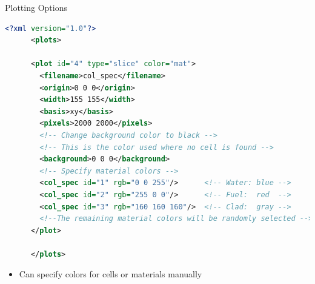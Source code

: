 
\begin{frame}[fragile]{Plotting Options}

  \begin{scriptsize}
    \begin{lstlisting}[language=XML,gobble=4]
      <?xml version="1.0"?>
      <plots>

      <plot id="4" type="slice" color="mat">
        <filename>col_spec</filename>
        <origin>0 0 0</origin>
        <width>155 155</width>
        <basis>xy</basis>
        <pixels>2000 2000</pixels>
        <!-- Change background color to black -->
        <!-- This is the color used where no cell is found -->
        <background>0 0 0</background>
        <!-- Specify material colors -->
        <col_spec id="1" rgb="0 0 255"/>      <!-- Water: blue -->
        <col_spec id="2" rgb="255 0 0"/>      <!-- Fuel:  red  -->
        <col_spec id="3" rgb="160 160 160"/>  <!-- Clad:  gray -->
        <!--The remaining material colors will be randomly selected -->
      </plot>

      </plots>
    \end{lstlisting}
  \end{scriptsize}

  \begin{itemize}
    \item Can specify colors for cells or materials manually
  \end{itemize}
  
  
\end{frame}

